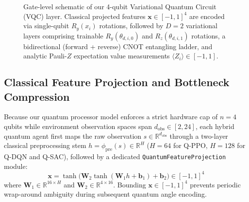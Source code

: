 \documentclass[conference]{IEEEtran}
\begin{document}
\begin{figure}[t]
{%
}
\caption{Gate-level schematic of our 4-qubit Variational Quantum Circuit (VQC) layer. Classical projected features $\mathbf{x} \in [-1,1]^4$ are encoded via single-qubit $R_y(x_i)$ rotations, followed by $D=2$ variational layers comprising trainable $R_y(\theta_{d,i,0})$ and $R_z(\theta_{d,i,1})$ rotations, a bidirectional (forward + reverse) CNOT entangling ladder, and analytic Pauli-$Z$ expectation value measurements $\langle Z_i \rangle \in [-1,1]$.}
\label{fig:vqc_circuit}
\end{figure}

\subsection{Classical Feature Projection and Bottleneck Compression}
Because our quantum processor model enforces a strict hardware cap of $n=4$ qubits while environment observation spaces span $d_{\text{obs}} \in [2, 24]$, each hybrid quantum agent first maps the raw observation $s \in \mathbb{R}^{d_{\text{obs}}}$ through a two-layer classical preprocessing stem $h = \phi_{\text{pre}}(s) \in \mathbb{R}^H$ ($H=64$ for Q-PPO, $H=128$ for Q-DQN and Q-SAC), followed by a dedicated \texttt{QuantumFeatureProjection} module:
\begin{equation}
\mathbf{x} = \tanh\Big( \mathbf{W}_2 \tanh(\mathbf{W}_1 h + \mathbf{b}_1) + \mathbf{b}_2 \Big) \in [-1, 1]^4
\label{eq:feature_proj}
\end{equation}
where $\mathbf{W}_1 \in \mathbb{R}^{16 \times H}$ and $\mathbf{W}_2 \in \mathbb{R}^{4 \times 16}$. Bounding $\mathbf{x} \in [-1, 1]^4$ prevents periodic wrap-around ambiguity during subsequent quantum angle encoding.
\end{document}
